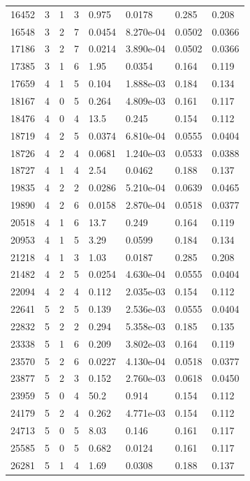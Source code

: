 \documentclass[preview]{standalone}
\begin{document}
{{{\begin{tabular}{L{1.2cm}C{1.2cm} C{0.3cm}C{0.5cm} C{1.4cm}C{1.4cm} C{1.4cm}C{1.4cm}}
  16452  &     3  & 1     &  3 &  0.975  & 0.0178  & 0.285 &  0.208   \\ 
  16548  &     3  & 2     &  7 &  0.0454  & 8.270e-04  & 0.0502 &  0.0366   \\ 
  17186  &     3  & 2     &  7 &  0.0214  & 3.890e-04  & 0.0502 &  0.0366   \\ 
  17385  &     3  & 1     &  6 &  1.95  & 0.0354  & 0.164 &  0.119   \\ 
  17659  &     4  & 1     &  5 &  0.104  & 1.888e-03  & 0.184 &  0.134   \\ 
  18167  &     4  & 0     &  5 &  0.264  & 4.809e-03  & 0.161 &  0.117   \\ 
  18476  &     4  & 0     &  4 &  13.5  & 0.245  & 0.154 &  0.112   \\ 
  18719  &     4  & 2     &  5 &  0.0374  & 6.810e-04  & 0.0555 &  0.0404   \\ 
  18726  &     4  & 2     &  4 &  0.0681  & 1.240e-03  & 0.0533 &  0.0388   \\ 
  18727  &     4  & 1     &  4 &  2.54  & 0.0462  & 0.188 &  0.137   \\ 
  19835  &     4  & 2     &  2 &  0.0286  & 5.210e-04  & 0.0639 &  0.0465   \\ 
  19890  &     4  & 2     &  6 &  0.0158  & 2.870e-04  & 0.0518 &  0.0377   \\ 
  20518  &     4  & 1     &  6 &  13.7  & 0.249  & 0.164 &  0.119   \\ 
  20953  &     4  & 1     &  5 &  3.29  & 0.0599  & 0.184 &  0.134   \\ 
  21218  &     4  & 1     &  3 &  1.03  & 0.0187  & 0.285 &  0.208   \\ 
  21482  &     4  & 2     &  5 &  0.0254  & 4.630e-04  & 0.0555 &  0.0404   \\ 
  22094  &     4  & 2     &  4 &  0.112  & 2.035e-03  & 0.154 &  0.112   \\ 
  22641  &     5  & 2     &  5 &  0.139  & 2.536e-03  & 0.0555 &  0.0404   \\ 
  22832  &     5  & 2     &  2 &  0.294  & 5.358e-03  & 0.185 &  0.135   \\ 
  23338  &     5  & 1     &  6 &  0.209  & 3.802e-03  & 0.164 &  0.119   \\ 
  23570  &     5  & 2     &  6 &  0.0227  & 4.130e-04  & 0.0518 &  0.0377   \\ 
  23877  &     5  & 2     &  3 &  0.152  & 2.760e-03  & 0.0618 &  0.0450   \\ 
  23959  &     5  & 0     &  4 &  50.2  & 0.914  & 0.154 &  0.112   \\ 
  24179  &     5  & 2     &  4 &  0.262  & 4.771e-03  & 0.154 &  0.112   \\ 
  24713  &     5  & 0     &  5 &  8.03  & 0.146  & 0.161 &  0.117   \\ 
  25585  &     5  & 0     &  5 &  0.682  & 0.0124  & 0.161 &  0.117   \\ 
  26281  &     5  & 1     &  4 &  1.69  & 0.0308  & 0.188 &  0.137   \\ 
\hline 
\end{tabular} 

}}}
\end{document}
